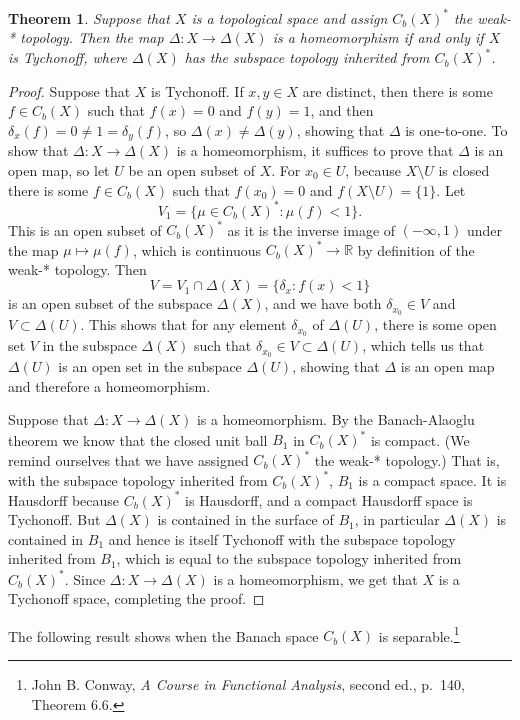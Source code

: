\documentclass{article}
\newtheorem{theorem}{Theorem}
\theoremstyle{definition}
\begin{document}
\begin{theorem}
Suppose that $X$ is a topological space and assign $C_b(X)^*$ the weak-* topology. Then the map
$\Delta:X \to \Delta(X)$ is a homeomorphism if and only if $X$ is Tychonoff, where $\Delta(X)$ has the subspace topology inherited from
$C_b(X)^*$.
\label{deltahomeo}
\end{theorem}
\begin{proof}
Suppose that $X$ is Tychonoff. If $x,y \in X$ are distinct, then there is some $f \in C_b(X)$ such that
$f(x)=0$ and $f(y)=1$, and then $\delta_x(f)=0 \neq 1 =\delta_y(f)$, so $\Delta(x) \neq \Delta(y)$, showing that $\Delta$ is one-to-one.
To show that $\Delta:X \to \Delta(X)$ is a homeomorphism, it suffices to prove that $\Delta$ is an open map, so let
$U$ be an open subset of $X$. For $x_0 \in U$, because $X \setminus U$ is closed there is some $f \in C_b(X)$ such that
$f(x_0)=0$ and $f(X \setminus U) = \{1\}$. Let 
\[
V_1=\{\mu \in C_b(X)^*: \mu(f)<1\}.
\]
This is an open subset of $C_b(X)^*$ as it is the inverse image of $(-\infty,1)$ under the  map
$\mu \mapsto \mu(f)$, which is continuous $C_b(X)^* \to \mathbb{R}$ by definition of the weak-* topology. 
Then
\[
V = V_1 \cap \Delta(X) = \{\delta_x : f(x)<1\}
\]
is an open subset of the subspace $\Delta(X)$, and we have both $\delta_{x_0} \in V$ and
$V \subset \Delta(U)$. This shows that for any element $\delta_{x_0}$ of $\Delta(U)$, there is some open set $V$ in the subspace
$\Delta(X)$ such that $\delta_{x_0} \in V \subset \Delta(U)$, 
which tells us that $\Delta(U)$ is an open set in the subspace $\Delta(U)$, showing that $\Delta$ is an open map and therefore
a homeomorphism.

Suppose that $\Delta:X \to \Delta(X)$ is a homeomorphism. By the Banach-Alaoglu theorem we know that
the closed unit ball $B_1$ in $C_b(X)^*$ is compact. (We remind ourselves that we have assigned $C_b(X)^*$ the weak-* topology.)
That is, with the subspace topology inherited from $C_b(X)^*$, $B_1$ is a compact space.
It is Hausdorff because $C_b(X)^*$ is Hausdorff, and a compact Hausdorff space is Tychonoff. But $\Delta(X)$ is contained in
the surface of $B_1$, in particular $\Delta(X)$ is contained in $B_1$ and hence is itself Tychonoff with the subspace topology
inherited from $B_1$, which is equal to the subspace topology inherited from $C_b(X)^*$. Since
$\Delta:X \to \Delta(X)$ is a homeomorphism, we get that $X$ is a Tychonoff space, completing the proof.
\end{proof}


The following result shows when the Banach space $C_b(X)$ is separable.\footnote{John B. Conway,
{\em A Course in Functional Analysis}, second ed., p.~140, Theorem 6.6.}
\end{document}
